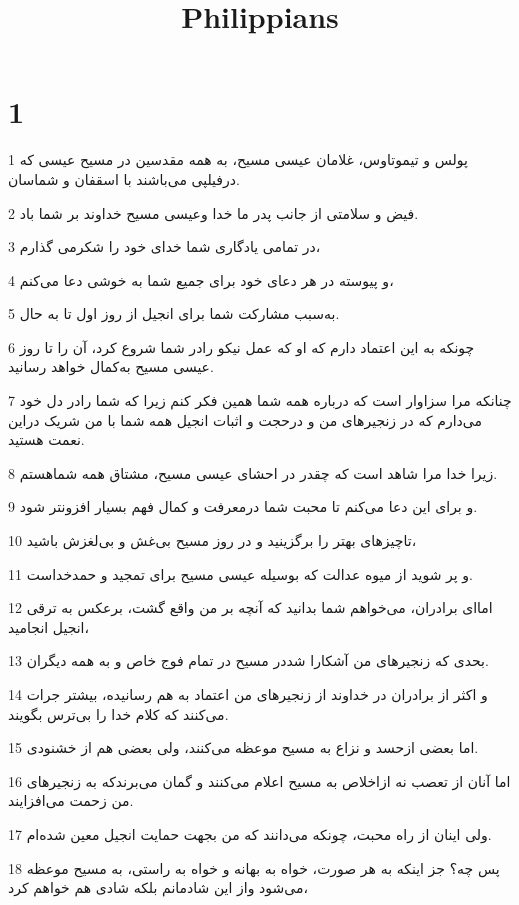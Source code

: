

\title{Philippians}


\chapter{1}

\par 1 پولس و تیموتاوس، غلامان عیسی مسیح، به همه مقدسین در مسیح عیسی که درفیلپی می‌باشند با اسقفان و شماسان.
\par 2 فیض و سلامتی از جانب پدر ما خدا وعیسی مسیح خداوند بر شما باد.
\par 3 در تمامی یادگاری شما خدای خود را شکرمی گذارم،
\par 4 و پیوسته در هر دعای خود برای جمیع شما به خوشی دعا می‌کنم،
\par 5 به‌سبب مشارکت شما برای انجیل از روز اول تا به حال.
\par 6 چونکه به این اعتماد دارم که او که عمل نیکو رادر شما شروع کرد، آن را تا روز عیسی مسیح به‌کمال خواهد رسانید.
\par 7 چنانکه مرا سزاوار است که درباره همه شما همین فکر کنم زیرا که شما رادر دل خود می‌دارم که در زنجیرهای من و درحجت و اثبات انجیل همه شما با من شریک دراین نعمت هستید.
\par 8 زیرا خدا مرا شاهد است که چقدر در احشای عیسی مسیح، مشتاق همه شماهستم.
\par 9 و برای این دعا می‌کنم تا محبت شما درمعرفت و کمال فهم بسیار افزونتر شود.
\par 10 تاچیزهای بهتر را برگزینید و در روز مسیح بی‌غش و بی‌لغزش باشید،
\par 11 و پر شوید از میوه عدالت که بوسیله عیسی مسیح برای تمجید و حمدخداست.
\par 12 اما‌ای برادران، می‌خواهم شما بدانید که آنچه بر من واقع گشت، برعکس به ترقی انجیل انجامید،
\par 13 بحدی که زنجیرهای من آشکارا شددر مسیح در تمام فوج خاص و به همه دیگران.
\par 14 و اکثر از برادران در خداوند از زنجیرهای من اعتماد به هم رسانیده، بیشتر جرات می‌کنند که کلام خدا را بی‌ترس بگویند.
\par 15 اما بعضی ازحسد و نزاع به مسیح موعظه می‌کنند، ولی بعضی هم از خشنودی.
\par 16 اما آنان از تعصب نه ازاخلاص به مسیح اعلام می‌کنند و گمان می‌برندکه به زنجیرهای من زحمت می‌افزایند.
\par 17 ولی اینان از راه محبت، چونکه می‌دانند که من بجهت حمایت انجیل معین شده‌ام.
\par 18 پس چه؟ جز اینکه به هر صورت، خواه به بهانه و خواه به راستی، به مسیح موعظه می‌شود واز این شادمانم بلکه شادی هم خواهم کرد،
